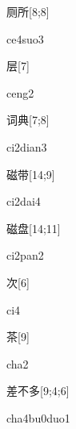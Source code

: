 \begin{verbete}[ce4suo3]{厕所}[8;8]
\begin{pronuncia}{ce4suo3}
\end{pronuncia}
\end{verbete}

\begin{verbete}[ceng2]{层}[7]
\begin{pronuncia}{ceng2}
\end{pronuncia}
\end{verbete}

\begin{verbete}[ci2dian3]{词典}[7;8]
\begin{pronuncia}{ci2dian3}
\end{pronuncia}
\end{verbete}

\begin{verbete}[ci2dai4]{磁带}[14;9]
\begin{pronuncia}{ci2dai4}
\end{pronuncia}
\end{verbete}

\begin{verbete}[ci2pan2]{磁盘}[14;11]
\begin{pronuncia}{ci2pan2}
\end{pronuncia}
\end{verbete}

\begin{verbete}[ci4]{次}[6]
\begin{pronuncia}{ci4}
\end{pronuncia}
\end{verbete}

\begin{verbete}[cha2]{茶}[9]
\begin{pronuncia}{cha2}
\end{pronuncia}
\end{verbete}

\begin{verbete}{差不多}[9;4;6]
\begin{pronuncia}{cha4bu0duo1}
\end{pronuncia}
\end{verbete}


